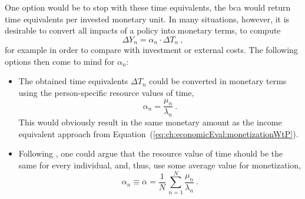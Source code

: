 One option would be to stop with these time equivalents, \ie the \gls{bca} would return time equivalents per invested monetary unit.  
%
In many situations, however, it is desirable to convert all impacts of a policy into monetary terms, \ie to compute
\begin{equation}
\Delta Y_n = \alpha_n \cdot \Delta T_n \ ,
\label{eq:ch:economicEval:monetizationTime2Money}
\end{equation}
for example in order to compare with investment or external costs.  The following options then come to mind for $\alpha_n$:
\begin{itemize}\styleItemize

\item
The obtained time equivalents $\Delta T_n$ could be converted in monetary terms using the person-specific resource values of time, \ie
\begin{equation}
\alpha_n = \frac{\mu_n}{\lambda_n} \ .
\label{eq:time2money-by-resource-VoT}
\end{equation}
%
This would obviously result in the same monetary amount as the income equivalent approach from Equation~(\ref{eq:ch:economicEval:monetizationWtP}). 
%
%

\item
Following \citet{MackieWorsley2013ComparisonTransportAppraisal}, one could argue that 
the resource value of time should be the same for every individual,
and, thus, use some average 
value for monetization, \eg 
\[
\alpha_n \equiv \overline\alpha = \frac{1}{N} \, \sum_{n=1}^N \frac{\mu_n}{\lambda_n} \ .
\]


\end{itemize}
